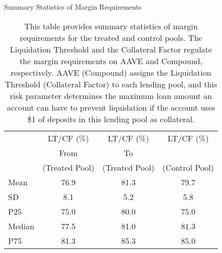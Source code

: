 \clearpage
\newpage
        

\begin{table}[ht!]
\caption{Summary Statistics of Margin Requirements}\label{tab:proposal_sumstat}
\caption*{This table provides summary statistics of margin requirements for the treated and control pools. The Liquidation Threshold and the Collateral Factor regulate the margin requirements on AAVE and Compound, respectively. AAVE (Compound) assigns the Liquidation Threshold (Collateral Factor) to each lending pool, and this risk parameter determines the maximum loan amount an account can have to prevent liquidation if the account uses \$1 of deposits in this lending pool as collateral. }


\centering
\def\sym#1{\ifmmode^{#1}\else\(^{#1}\)\fi}


\begin{tabular*}{\linewidth}{@{\extracolsep{\fill}}lccc}
    \toprule
     &   LT/CF (\%)  & LT/CF (\%)  & LT/CF (\%) \\
          &   From &  To &\\
               & (Treated Pool)  & (Treated Pool)  &  (Control Pool) \\
          \midrule
    Mean        & 76.9   & 81.3   & 79.7 \\
    SD           & 8.1   & 5.2  &  5.8 \\
    P25        & 75.0   & 80.0   & 75.0 \\
    Median       & 77.5   & 81.0   & 81.3 \\
    P75         & 81.3   & 85.3  &  85.0 \\
    \bottomrule
          \end{tabular*} 



\end{table}%
    
\clearpage
\newpage
    

